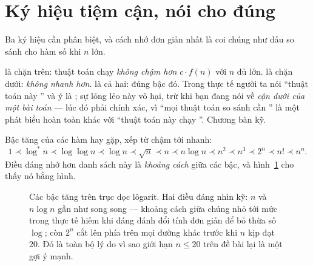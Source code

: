 \documentclass[../../algorithm.tex]{subfiles}
\begin{document}
\section{Ký hiệu tiệm cận, nói cho đúng}

Ba ký hiệu cần phân biệt, và cách nhớ đơn giản nhất là coi chúng như dấu so sánh cho hàm số khi \(n\) lớn.

 là chặn trên: thuật toán chạy \emph{không chậm hơn} \(c\cdot f(n)\) với \(n\) đủ lớn.  là chặn dưới: \emph{không nhanh hơn}.  là cả hai: đúng bậc đó. Trong thực tế người ta nói ``thuật toán này '' và ý là ; sự lỏng lẻo này vô hại, trừ khi bạn đang nói về \emph{cận dưới của một bài toán} --- lúc đó phải chính xác, vì ``mọi thuật toán so sánh cần '' là một phát biểu hoàn toàn khác với ``thuật toán này chạy ''. Chương  bàn kỹ.

Bậc tăng của các hàm hay gặp, xếp từ chậm tới nhanh:
\[
1 \prec \log^* n \prec \log\log n \prec \log n \prec \sqrt{n} \prec n \prec n\log n \prec n^2 \prec n^3 \prec 2^n \prec n! \prec n^n .
\]
Điều đáng nhớ hơn danh sách này là \emph{khoảng cách} giữa các bậc, và hình~\ref{fig:bac-tang} cho thấy nó bằng hình.

\begin{figure}[H]\centering
{}
\caption{Các bậc tăng trên trục dọc lôgarit. Hai điều đáng nhìn kỹ: \(n\) và \(n\log n\) gần như song song --- khoảng cách giữa chúng nhỏ tới mức trong thực tế hiếm khi đáng đánh đổi tính đơn giản để bỏ thừa số \(\log\); còn \(2^n\) cắt lên phía trên mọi đường khác trước khi \(n\) kịp đạt 20. Đó là toàn bộ lý do vì sao giới hạn \(n \le 20\) trên đề bài lại là một gợi ý mạnh.}
\label{fig:bac-tang}
\end{figure}
\end{document}
